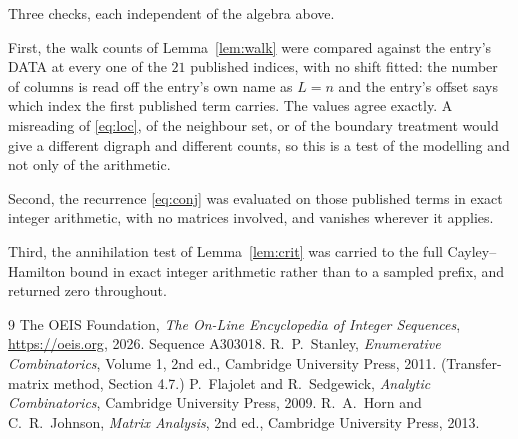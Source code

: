 \documentclass[11pt,a4paper]{article}
\theoremstyle{plain}
\theoremstyle{definition}
\begin{document}
Three checks, each independent of the algebra above.

First, the walk counts of Lemma~\ref{lem:walk} were compared against the entry's DATA at
every one of the $21$ published indices, with no shift fitted: the number of columns is
read off the entry's own name as $L=n$ and the entry's offset says which index the first
published term carries. The values agree exactly. A misreading of \eqref{eq:loc}, of the
neighbour set, or of the boundary treatment would give a different digraph and different
counts, so this is a test of the modelling and not only of the arithmetic.

Second, the recurrence \eqref{eq:conj} was evaluated on those published terms in exact
integer arithmetic, with no matrices involved, and vanishes wherever it applies.

Third, the annihilation test of Lemma~\ref{lem:crit} was carried to the full
Cayley--Hamilton bound in exact integer arithmetic rather than to a sampled prefix, and
returned zero throughout.

\begin{thebibliography}{9}
 The OEIS Foundation, \emph{The On-Line Encyclopedia of Integer
Sequences}, \url{https://oeis.org}, 2026. Sequence A303018.
 R.~P.~Stanley, \emph{Enumerative Combinatorics}, Volume 1, 2nd ed.,
Cambridge University Press, 2011. (Transfer-matrix method, Section 4.7.)
 P.~Flajolet and R.~Sedgewick, \emph{Analytic Combinatorics}, Cambridge
University Press, 2009.
 R.~A.~Horn and C.~R.~Johnson, \emph{Matrix Analysis}, 2nd ed., Cambridge
University Press, 2013.
\end{thebibliography}
\end{document}

